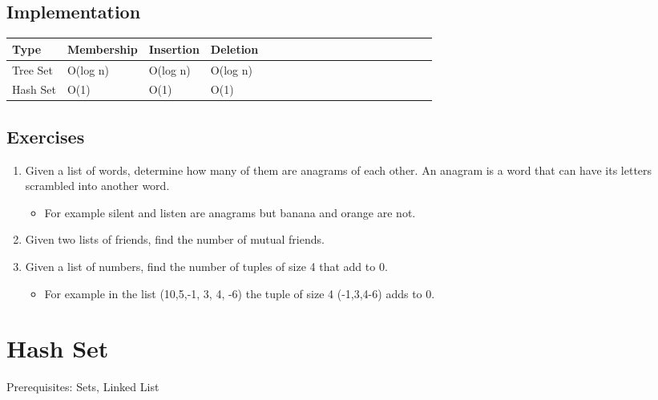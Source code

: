 \documentclass[11pt,oneside]{book}
\begin{document}
\subsection{Implementation}

\vspace{10px}\begin{tabulary}{0.4\linewidth}{|l|l|l|l|l|l|l|l|l|l|l|l|l|l|l|l|l|l|l}\hline


  Type &
  Membership &
  Insertion &
  Deletion\\
\hline


  Tree Set &
  O(log n) &
  O(log n) &
  O(log n)\\

  Hash Set &
  O(1) &
  O(1) &
  O(1)\\

\hline\end{tabulary}

\subsection{Exercises}

\begin{enumerate}
\item Given a list of words, determine how many of them are anagrams of each other. An anagram is a word that can have its letters scrambled into another word. 

\begin{itemize}
\item For example silent and listen are anagrams but banana and orange are not.
\end{itemize}
\item Given two lists of friends, find the number of mutual friends.
\item Given a list of numbers, find the number of tuples of size 4 that add to 0. 

\begin{itemize}
\item For example in the list (10,5,-1, 3, 4, -6) the tuple of size 4 (-1,3,4-6) adds to 0.
\end{itemize}
\end{enumerate}

        \section{ Hash Set }
        

Prerequisites: Sets, Linked List
\end{document}
